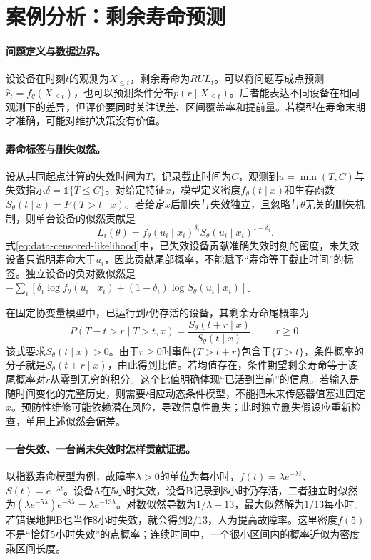 \section{案例分析：剩余寿命预测}
\paragraph{问题定义与数据边界。}
设设备在时刻$t$的观测为$X_{\leq t}$，剩余寿命为$RUL_t$。可以将问题写成点预测$\hat r_t=f_\theta(X_{\leq t})$，也可以预测条件分布$p(r\mid X_{\leq t})$。后者能表达不同设备在相同观测下的差异，但评价要同时关注误差、区间覆盖率和提前量。若模型在寿命末期才准确，可能对维护决策没有价值。

\paragraph{寿命标签与删失似然。}
设从共同起点计算的失效时间为$T$，记录截止时间为$C$，观测到$u=\min(T,C)$与失效指示$\delta=\mathbb 1\{T\leq C\}$。对给定特征$x$，模型定义密度$f_\theta(t\mid x)$和生存函数$S_\theta(t\mid x)=P(T>t\mid x)$。若给定$x$后删失与失效独立，且忽略与$\theta$无关的删失机制，则单台设备的似然贡献是
\begin{equation}
 L_i(\theta)=f_\theta(u_i\mid x_i)^{\delta_i}
 S_\theta(u_i\mid x_i)^{1-\delta_i}.\label{eq:data-censored-likelihood}
\end{equation}
式\eqref{eq:data-censored-likelihood}中，已失效设备贡献准确失效时刻的密度，未失效设备只说明寿命大于$u_i$，因此贡献尾部概率，不能赋予“寿命等于截止时间”的标签。独立设备的负对数似然是$-\sum_i[\delta_i\log f_\theta(u_i\mid x_i)+(1-\delta_i)\log S_\theta(u_i\mid x_i)]$。

在固定协变量模型中，已运行到$t$仍存活的设备，其剩余寿命尾概率为
\begin{equation}
 P(T-t>r\mid T>t,x)=\frac{S_\theta(t+r\mid x)}{S_\theta(t\mid x)},\qquad r\geq0.
\end{equation}
该式要求$S_\theta(t\mid x)>0$。由于$r\geq0$时事件$\{T>t+r\}$包含于$\{T>t\}$，条件概率的分子就是$S_\theta(t+r\mid x)$，由此得到比值。若均值存在，条件期望剩余寿命等于该尾概率对$r$从零到无穷的积分。这个比值明确体现“已活到当前”的信息。若输入是随时间变化的完整历史，则需要相应动态条件模型，不能把未来传感器值塞进固定$x$。预防性维修可能依赖潜在风险，导致信息性删失；此时独立删失假设应重新检查，单用上述似然会偏差。

\paragraph{一台失效、一台尚未失效时怎样贡献证据。}
以指数寿命模型为例，故障率$\lambda>0$的单位为每小时，$f(t)=\lambda e^{-\lambda t}$、$S(t)=e^{-\lambda t}$。设备A在5小时失效，设备B记录到8小时仍存活，二者独立时似然为$(\lambda e^{-5\lambda})e^{-8\lambda}=\lambda e^{-13\lambda}$。对数似然导数为$1/\lambda-13$，最大似然解为$1/13$每小时。若错误地把B也当作8小时失效，就会得到$2/13$，人为提高故障率。这里密度$f(5)$不是“恰好5小时失效”的点概率；连续时间中，一个很小区间内的概率近似为密度乘区间长度。

